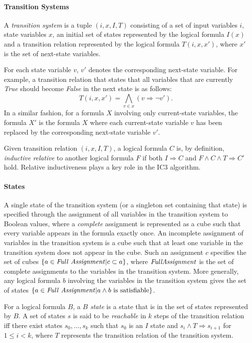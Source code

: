 \documentclass[12pt,a4paper,twoside,openright]{report}
\begin{document}
\paragraph{Transition Systems}{
A \emph{transition system} is a tuple $(i,x,I,T)$ consisting of a set of input
variables $i$, state variables $x$, an initial
set of states represented by the logical formula $I(x)$ and
a transition relation represented by the logical formula $T(i,x,x')$,
where $x'$ is the set of next-state variables.

For each state variable $v$, $v'$ denotes the corresponding next-state variable.
For example, a transition relation that states that all variables that are
currently {\it True} should become {\it False} in the next state is as follows:
$$T(i,x,x') = \bigwedge_{v \in x} (v \Rightarrow \neg v').$$
In a similar fashion, for a formula $X$ involving only current-state variables,
the formula $X'$ is the formula $X$ where each current-state variable $v$ has
been replaced by the corresponding next-state variable $v'$.

Given transition relation $(i,x,I,T)$, a logical formula $C$ is, by definition,
\emph{inductive relative} to another logical formula $F$ if both
$I \Rightarrow C$ and $F \wedge C \wedge T \Rightarrow C'$ hold.
Relative inductiveness plays a key role in the IC3 algorithm.
}

\paragraph{States}{
A single state of the transition system (or a singleton set containing that state)
is specified through the assignment of all variables in the transition system
to Boolean values, where a \emph{complete} assignment is represented as a cube such
that every variable appears in the formula exactly once.
An incomplete assignment of variables in the transition system is a cube such that
at least one variable in the transition system does not appear in the cube. Such an
assignment $c$ specifies the set of cubes $\{a \in{\it Full~Assignment}|c \subset a\}$,
where ${\it Full Assignment}$ is the set of complete assignments to the variables in the
transition system.
More generally, any logical formula $b$ involving the variables in the transition
system gives the set of states
$\{a \in {\it Full~Assignment} | a \wedge b~{\rm is~satisfiable}\}$.

For a logical formula $B$, a \emph{$B$ state} is a state that is in the set of states
represented
by $B$. A set of states $s$ is said to be \emph{reachable}
in $k$ steps of the transition relation iff there exist states $s_0, \ldots, s_k$ such that
$s_0$ is an $I$ state and $s_i \wedge T \Rightarrow s_{i + 1}$ for $1 \leq i < k$,
where $T$ represents the transition relation of the transition system.

}
\end{document}
